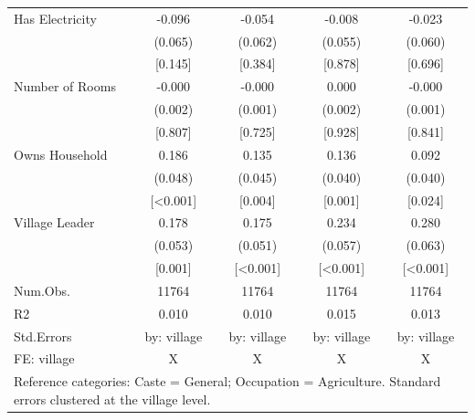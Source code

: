 \begin{table}
\begin{tabular}[t]{lcccc}
Has Electricity & -0.096 & -0.054 & -0.008 & -0.023\\
 & (0.065) & (0.062) & (0.055) & (0.060)\\
 & {}[0.145] & {}[0.384] & {}[0.878] & {}[0.696]\\
Number of Rooms & -0.000 & -0.000 & 0.000 & -0.000\\
 & (0.002) & (0.001) & (0.002) & (0.001)\\
 & {}[0.807] & {}[0.725] & {}[0.928] & {}[0.841]\\
Owns Household & 0.186 & 0.135 & 0.136 & 0.092\\
 & (0.048) & (0.045) & (0.040) & (0.040)\\
 & {}[<0.001] & {}[0.004] & {}[0.001] & {}[0.024]\\
Village Leader & 0.178 & 0.175 & 0.234 & 0.280\\
 & (0.053) & (0.051) & (0.057) & (0.063)\\
 & {}[0.001] & {}[<0.001] & {}[<0.001] & {}[<0.001]\\
\midrule
Num.Obs. & 11764 & 11764 & 11764 & 11764\\
R2 & 0.010 & 0.010 & 0.015 & 0.013\\
Std.Errors & by: village & by: village & by: village & by: village\\
FE: village & X & X & X & X\\
\bottomrule
\multicolumn{5}{l}{\rule{0pt}{1em}Reference categories: Caste = General; Occupation = Agriculture. Standard errors clustered at the village level.}\\
\end{tabular}
\end{table}
